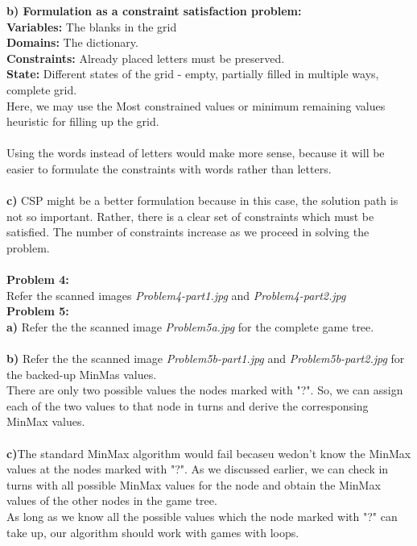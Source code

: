 {\bf b) Formulation as a constraint satisfaction problem:}\\
{\bf Variables:} The blanks in the grid \\
{\bf Domains:} The dictionary.\\
{\bf Constraints:} Already placed letters must be preserved.\\
{\bf State:} Different states of the grid - empty, partially filled in multiple ways, complete grid.\\
Here, we may use the Most constrained values or minimum remaining values heuristic for filling up the grid.\\ \\
Using the words instead of letters would make more sense, because it will be easier to formulate the constraints with  words rather than letters.\\ \\

{\bf c)} CSP might be a better formulation because in this case, the solution path is not so important. Rather, there is a clear set of constraints which must be satisfied. The number of constraints increase as we proceed in solving the problem.\\ \\

{\bf Problem 4:}\\ Refer the scanned images {\it Problem4-part1.jpg} and {\it Problem4-part2.jpg}\\

{\bf Problem 5:}\\
{\bf a)} Refer the the scanned image {\it Problem5a.jpg} for the complete game tree.\\ \\
{\bf b)} Refer the the scanned image {\it Problem5b-part1.jpg} and {\it Problem5b-part2.jpg} for the backed-up MinMas values.\\
There are only two possible values the nodes marked with "?". So, we can assign each of the two values to that node in turns and derive the corresponsing MinMax values.\\ \\

{\bf c)}The standard MinMax algorithm would fail becaseu wedon't know the MinMax values at the nodes marked with "?". As we discussed earlier, we can check in turns with all possible MinMax values for the node and obtain the MinMax values of the other nodes in the game tree.\\
As long as we know all the possible values which the node marked with "?" can take up, our algorithm should work with games with loops. \\ \\

